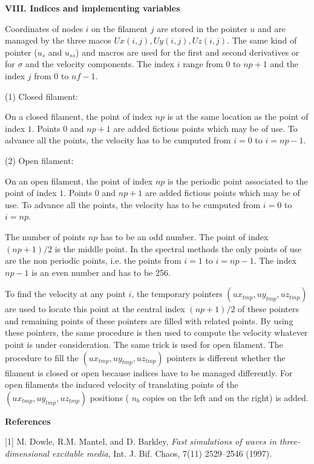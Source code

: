 \medskip
{\bf VIII. Indices and  implementing variables} 
\smallskip


    Coordinates of nodes $i$ on the filament $j$ are stored in the pointer $u$ and are managed by the three macos $Ux(i,j),Uy(i,j),Uz(i,j).$ The same kind of pointer ($u_s$ and $u_{ss}$) and macros are used for the first and second derivatives or for $\sigma$ and the velocity components. The index $i$ range from $0$ to $np+1$ and the index $j$ from $0$ to $nf-1.$ 


(1) Closed filament:
    
    On a closed filament, the point of index $np$ is at the same location as the point of index $1$. Points $0$ and $np+1$ are added fictious points which may be of use. To advance all the points, the velocity has to be cumputed from $i=0$ to $i=np-1$.


(2) Open filament:

   On an open  filament, the point of index $np$ is the periodic point associated to the point of index $1$. Points $0$ and $np+1$ are added fictious points which may be of use. To advance all the points, the velocity has to be cumputed from $i=0$ to $i=np$.


   The number of points $np$ has to be an odd number. The point of index $(np+1)/2$ is the middle point. In the spectral methods the only points of use are the non periodic points, {i.e.} the points from $i=1$ to $i=np-1.$  The index $np-1$ is an even number and has to be 256.

   To  find the velocity at any point $i$, the temporary pointers $(ux_{tmp},uy_{tmp},uz_{tmp})$ are used to locate this point at the central index $(np+1)/2$ of these pointers and remaining points of these pointers are filled with related points. By using these pointers, the same procedure is then used to compute the velocity whatever point is under consideration. The same trick is used for open filament. The procedure to fill the $(ux_{tmp},uy_{tmp},uz_{tmp})$ pointers is different whether the filament is closed or open because indices have to be managed differently. For open filaments the induced velocity of translating points of the $(ux_{tmp},uy_{tmp},uz_{tmp})$ positions ( $n_b$ copies on the left and  on the right) is added. 




\bigskip

{\bf References} 

[1] M. Dowle, R.M. Mantel, and D. Barkley, {\it Fast simulations of waves in three-dimensional excitable media}, Int. J. Bif. Chaos, 7(11) 2529--2546 (1997).

